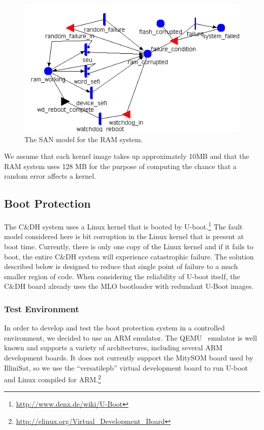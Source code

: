 \begin{figure}
\centering
\includegraphics[scale=0.8]{ram_system}
\caption{The SAN model for the RAM system.}
\label{fig:ramsan}
\end{figure}


We assume that each kernel image takes up approximately 10MB and that the RAM system uses 128 MB for the purpose of computing the chance that a random error affects a kernel.

\subsection{Boot Protection}

The C\&DH system uses a Linux kernel that is booted by
U-boot.\footnote{\url{http://www.denx.de/wiki/U-Boot}} The fault model
considered here is bit corruption in the Linux kernel that is present at boot
time.  Currently, there is only one copy of the Linux kernel and if it fails to
boot, the entire C\&DH system will experience catastrophic failure.  The
solution described below is designed to reduce that single point of failure to a
much smaller region of code.  When considering the reliability of U-boot itself,
the C\&DH board already uses the MLO bootloader with redundant U-Boot images.

\subsubsection{Test Environment}
In order to develop and test the boot protection system in a controlled
environment, we decided to use an ARM emulator.  The QEMU~\cite{bellard2005qemu}
emulator is well known and supports a variety of architectures, including
several ARM development boards.  It does not currently support the MitySOM board
used by IlliniSat, so we use the ``versatilepb'' virtual development board to
run U-boot and Linux compiled for
ARM.\footnote{\url{http://elinux.org/Virtual_Development_Board}}

